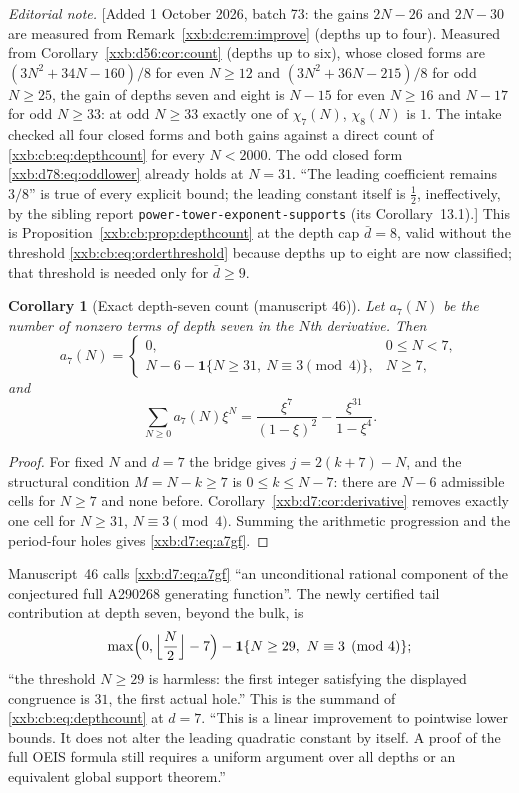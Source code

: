 \documentclass[11pt,a4paper]{article}
\numberwithin{equation}{section}
\newtheorem{corollary}[theorem]{Corollary}
\theoremstyle{definition}
\theoremstyle{remark}
\theoremstyle{plain}
\newcommand{\sibPTE}{\texttt{power-\allowbreak{}tower-\allowbreak{}exponent-\allowbreak{}supports}}
\begin{document}
\emph{Editorial note.}  [Added 1 October 2026, batch 73: the gains $2N-26$
and $2N-30$ are measured from Remark~\ref{xxb:dc:rem:improve} (depths up to
four).  Measured from Corollary~\ref{xxb:d56:cor:count} (depths up to six),
whose closed forms are $(3N^2+34N-160)/8$ for even $N\ge12$ and
$(3N^2+36N-215)/8$ for odd $N\ge25$, the gain of depths seven and eight is
$N-15$ for even $N\ge16$ and $N-17$ for odd $N\ge33$: at odd $N\ge33$ exactly
one of $\chi_7(N)$, $\chi_8(N)$ is $1$.  The intake checked all four closed
forms and both gains against a direct count of \eqref{xxb:cb:eq:depthcount}
for every $N<2000$.  The odd closed form \eqref{xxb:d78:eq:oddlower} already
holds at $N=31$.  ``The leading coefficient remains $3/8$'' is true of every
explicit bound; the leading constant itself is $\tfrac12$, ineffectively, by
the sibling report \sibPTE{} (its Corollary~13.1).]  This is
Proposition~\ref{xxb:cb:prop:depthcount} at the depth cap $\bar d=8$, valid
without the threshold \eqref{xxb:cb:eq:orderthreshold} because depths up to
eight are now classified; that threshold is needed only for $\bar d\ge9$.

\begin{corollary}[Exact depth-seven count (manuscript 46)]\label{xxb:d7:cor:depthcount}
Let $a_7(N)$ be the number of nonzero terms of depth seven in the $N$th
derivative.  Then
\begin{equation}\label{xxb:d7:eq:a7}
 a_7(N)=\begin{cases}0,&0\le N<7,\\
 N-6-\mathbf 1\{N\ge31,\ N\equiv3\pmod4\},&N\ge7,\end{cases}
\end{equation}
and
\begin{equation}\label{xxb:d7:eq:a7gf}
 \sum_{N\ge0}a_7(N)\xi^N=\frac{\xi^7}{(1-\xi)^2}-\frac{\xi^{31}}{1-\xi^4}.
\end{equation}
\end{corollary}
\begin{proof}
For fixed $N$ and $d=7$ the bridge gives $j=2(k+7)-N$, and the structural
condition $M=N-k\ge7$ is $0\le k\le N-7$: there are $N-6$ admissible cells for
$N\ge7$ and none before.  Corollary~\ref{xxb:d7:cor:derivative} removes exactly
one cell for $N\ge31$, $N\equiv3\pmod4$.  Summing the arithmetic progression and
the period-four holes gives \eqref{xxb:d7:eq:a7gf}.
\end{proof}
Manuscript~46 calls \eqref{xxb:d7:eq:a7gf} ``an unconditional rational
component of the conjectured full A290268 generating function''.  The newly
certified tail contribution at depth seven, beyond the bulk, is
\begin{equation}\label{xxb:d7:eq:increment}
 \max\Bigl(0,\Bigl\lfloor\frac N2\Bigr\rfloor-7\Bigr)
 -\mathbf 1\{N\ge29,\ N\equiv3\pmod4\};
\end{equation}
``the threshold $N\geq29$ is harmless: the first integer satisfying the
displayed congruence is $31$, the first actual hole.''  This is the summand of
\eqref{xxb:cb:eq:depthcount} at $d=7$.  ``This is a linear improvement to
pointwise lower bounds.  It does not alter the leading quadratic constant by
itself.  A proof of the full OEIS formula still requires a uniform argument
over all depths or an equivalent global support theorem.''
\end{document}
